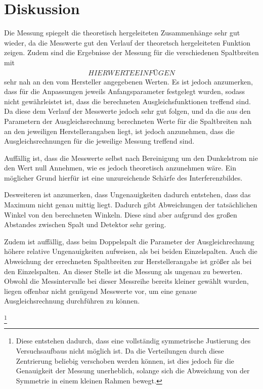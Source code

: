 \section{Diskussion}
\label{sec:Diskussion}
Die Messung spiegelt die theoretisch hergeleiteten Zusammenhänge sehr gut wieder,
da die Messwerte gut den Verlauf der theoretsch hergeleiteten Funktion zeigen. Zudem
sind die Ergebnisse der Messung für die verschiedenen Spaltbreiten mit
\begin{align*}
  HIER WERTE EINFÜGEN
\end{align*}
sehr nah an den vom Hersteller angegebenen Werten.
Es ist jedoch anzumerken, dass für die Anpassungen jeweils Anfangsparameter festgelegt
wurden, sodass nicht gewährleistet ist, dass die berechneten Ausgleichsfunktionen
treffend sind. Da diese dem Verlauf der Messwerte jedoch sehr gut folgen, und da
die aus den Parametern der Ausgleichsrechnung berechneten Werte für die Spaltbreiten
nah an den jeweiligen Herstellerangaben liegt, ist jedoch
anzunehmen, dass die Ausgleichsrechnungen für die jeweilige Messung treffend sind.

Auffällig ist, dass die Messwerte selbst nach Bereinigung um den Dunkelstrom nie
den Wert null Annehmen, wie es jedoch  theoretisch anzunehmen wäre. Ein möglicher Grund
hierfür ist eine unzureichende Schärfe des Interferenzbildes.

Desweiteren ist anzumerken, dass Ungenauigkeiten dadurch entstehen, dass das Maximum
nicht genau mittig liegt. Dadurch gibt Abweichungen der tatsächlichen Winkel
von den berechneten Winkeln. Diese sind aber aufgrund des großen Abstandes zwischen
Spalt und Detektor sehr gering. 

Zudem ist auffällig, dass beim Doppelspalt die Parameter der Ausgleichrechnung höhere
relative Ungenauigkeiten aufweisen, als bei beiden Einzelspalten. Auch die Abweichung
der errechneten Spaltbreiten zur Herstellerangabe ist größer als bei den Einzelspalten.
An dieser Stelle ist die Messung als ungenau zu bewerten. Obwohl die Messintervalle
bei dieser Messreihe bereits kleiner gewählt wurden, liegen offenbar nicht genügend Messwerte
vor, um eine genaue Ausgleichsrechnung durchführen zu können.



\footnote{Diese entstehen dadurch, dass eine vollständig symmetrische Justierung
des Versuchsaufbaus nicht möglich ist. Da die Verteilungen durch diese Zentrierung
beliebig verschoben werden können, ist dies jedoch für die Genauigkeit der Messung
unerheblich, solange sich die Abweichung von der Symmetrie in einem kleinen Rahmen bewegt.}
